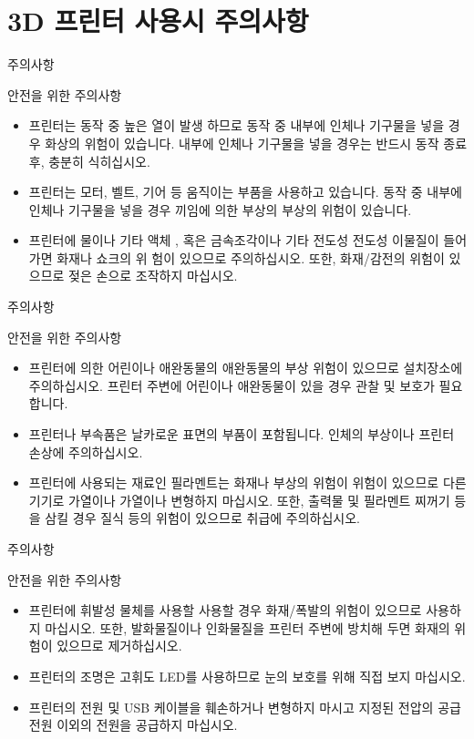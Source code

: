 
\section{3D 프린터 사용시 주의사항}

\begin{frame}{주의사항}
\begin{block}{안전을 위한 주의사항}
	\begin{itemize}
		\item 프린터는 동작 중 높은 열이 발생 하므로 동작 중 내부에 인체나 기구물을 넣을 경우 화상의 위험이 있습니다. 내부에 인체나 기구물을 넣을 경우는 반드시 동작 종료 후, 충분히 식히십시오.
		\item 프린터는 모터, 벨트, 기어 등 움직이는 부품을 사용하고 있습니다. 동작 중 내부에 인체나 기구물을 넣을 경우 끼임에 의한 부상의 부상의 위험이 있습니다.
		\item 프린터에 물이나 기타 액체 , 혹은 금속조각이나 기타 전도성 전도성 이물질이 들어가면 화재나 쇼크의 위 험이 있으므로 주의하십시오. 또한, 화재/감전의 위험이 있으므로 젖은 손으로 조작하지 마십시오.
	\end{itemize}
\end{block}
\end{frame}

\begin{frame}{주의사항}
\begin{block}{안전을 위한 주의사항}
\begin{itemize}
	\item 프린터에 의한 어린이나 애완동물의 애완동물의 부상 위험이 있으므로 설치장소에 주의하십시오. 프린터 주변에 어린이나 애완동물이 있을 경우 관찰 및 보호가 필요합니다.
	\item 프린터나 부속품은 날카로운 표면의 부품이 포함됩니다. 인체의 부상이나 프린터 손상에 주의하십시오.
	\item 프린터에 사용되는 재료인 필라멘트는 화재나 부상의 위험이 위험이 있으므로 다른 기기로 가열이나 가열이나 변형하지 마십시오. 또한, 출력물 및 필라멘트 찌꺼기 등을 삼킬 경우 질식 등의 위험이 있으므로 취급에 주의하십시오.
\end{itemize}
\end{block}
\end{frame}

\begin{frame}{주의사항}
\begin{block}{안전을 위한 주의사항}
\begin{itemize}
\item 프린터에 휘발성 물체를 사용할 사용할 경우 화재/폭발의 위험이 있으므로 사용하지 마십시오. 또한, 발화물질이나 인화물질을 프린터 주변에 방치해 두면 화재의 위험이 있으므로 제거하십시오.
\item 프린터의 조명은 고휘도 LED를 사용하므로 눈의 보호를 위해 직접 보지 마십시오.
\item 프린터의 전원 및 USB 케이블을 훼손하거나 변형하지 마시고 지정된 전압의 공급전원 이외의 전원을 공급하지 마십시오.
\end{itemize}
\end{block}
\end{frame}

